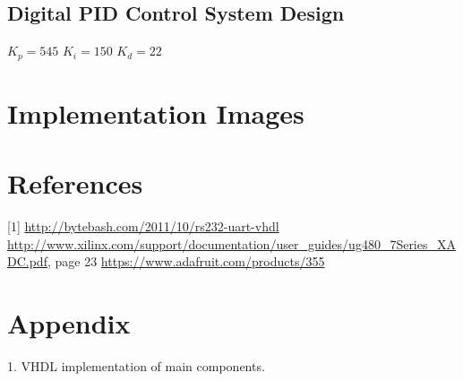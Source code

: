 \documentclass{article}
\begin{document}
\subsection{Digital PID Control System Design}
\begin{center}
$K_p=545$	$K_i=150$	$K_d=22$
\end{center}
\section{Implementation Images}

\section{References}

[1] \url{http://bytebash.com/2011/10/rs232-uart-vhdl} \newline
[2] \url{http://www.xilinx.com/support/documentation/user_guides/ug480_7Series_XADC.pdf}, page 23 \newline
[3] \url{https://www.adafruit.com/products/355}

\section{Appendix}
1. VHDL implementation of main components.
\end{document}
